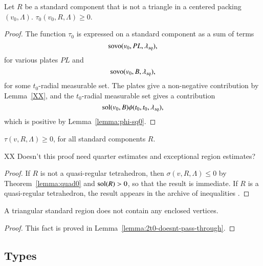 
\begin{lemma}
    \label{lemma:tau-positive}
    Let $R$ be a standard component that is not a triangle in a
    centered packing $(v_0,\Lambda)$.
    $\tau_{0}(v_0,R,\Lambda)\ge 0$.
\end{lemma}

\begin{proof}
The function $\tau_0$ is expressed on a standard component as a sum
of terms
  $$
  {\operatorname{sovo}}(v_0,PL,\lambda_{sq}),
  $$
for various plates $PL$ and
   $$
   {\operatorname{sovo}}(v_0,B,\lambda_{sq}),
   $$
for some $t_0$-radial measurable set.  %
The plates give a non-negative contribution by Lemma~\ref{XX},
and the $t_0$-radial measurable set gives a contribution
   $$
   \operatorname{sol}(v_0,B)\phi(t_0,t_0,\lambda_{sq}),
   $$
which is positive by Lemma~\ref{lemma:phi-sq0}.
\end{proof}


\begin{lemma}\label{lemma:roger0}
    $\tau(v,R,\Lambda)\ge 0$, for all standard components $R$.
\end{lemma}

XX Doesn't this proof need quarter estimates and exceptional region
estimates?

\begin{proof}
If $R$ is not a quasi-regular tetrahedron, then $\sigma(v,R,\Lambda)\le0$
by Theorem~\ref{lemma:quad0} and $\operatorname{sol}(R)> 0$, so that the result
is immediate. If $R$ is a quasi-regular tetrahedron, the result
appears in the archive of inequalities .
\end{proof}



\begin{lemma}
        \label{lemma:no-enclosed-tri}
        A triangular standard region does not contain any enclosed
        vertices.
\end{lemma}

\begin{proof}
    This fact is proved in Lemma~\ref{lemma:2t0-doesnt-pass-through}.
\end{proof}





\subsection{Types}\label{sec:types}%

